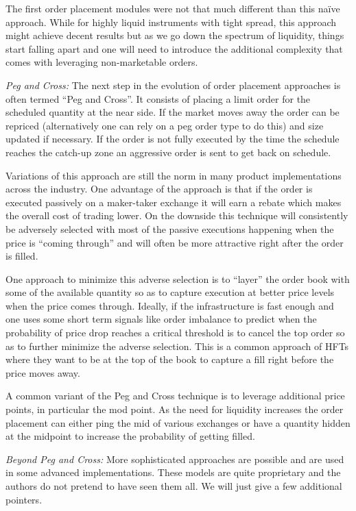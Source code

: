 The first order placement modules were not that much different than this na\"ive approach. While for highly liquid instruments with tight spread, this approach might achieve decent results but as we go down the spectrum of liquidity, things start falling apart and one will need to introduce the additional complexity that comes with leveraging non-marketable orders. \twomedskip


\noindent\emph{Peg and Cross:} The next step in the evolution of order placement approaches is often termed ``Peg and Cross''. It consists of placing a limit order  for the scheduled quantity at the near side. If the market moves away the order can be repriced (alternatively one can rely on a peg order type to do this) and size updated if necessary. If the order is not fully executed by the time the schedule reaches the catch-up zone an aggressive order is sent to get back on schedule.


Variations of this approach are still the norm in many product implementations across the industry. One advantage of the approach is that if  the order is executed passively on a maker-taker exchange it will earn a rebate which makes the overall cost of trading lower. On the downside this technique will consistently be adversely selected with most of the passive executions happening when the price is ``coming through'' and will often be more attractive right after the order is filled.


One approach to minimize this adverse selection is to ``layer'' the order book with some of the available quantity so as to capture execution at better price levels when the price comes through. Ideally, if the infrastructure is fast enough and one uses some short term signals like order imbalance to predict when the probability of price drop reaches a critical threshold is to cancel the top order so as to further minimize the adverse selection. This is a common approach of HFTs where they want to be at the top of the book to capture a fill right before the price moves away.


A common variant of the Peg and Cross technique is to leverage additional price points, in particular the mod point. As the need for liquidity increases the order placement can either ping the mid of various exchanges or have a quantity hidden at the midpoint to increase the probability of getting filled. \twomedskip


\noindent\emph{Beyond Peg and Cross:} More sophisticated approaches are possible and are used in some advanced implementations. These models are quite proprietary and the authors do not pretend to have seen them all. We will just give a few additional pointers.


